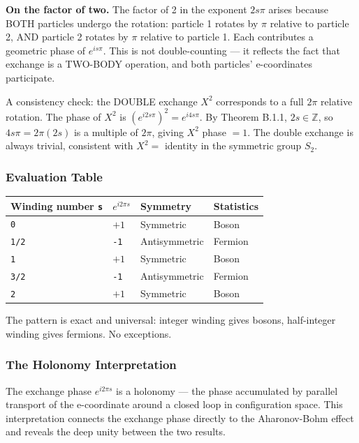 \documentclass[aps,prd,preprint,superscriptaddress,longbibliography,floatfix]{revtex4-2}
\theoremstyle{remark}
\begin{document}
\textbf{On the factor of two.} The factor of 2 in the exponent $2s\pi$ arises because BOTH particles undergo the rotation: particle 1 rotates by $\pi$ relative to particle 2, AND particle 2 rotates by $\pi$ relative to particle 1. Each contributes a geometric phase of $e^{is\pi}$. This is not double-counting --- it reflects the fact that exchange is a TWO-BODY operation, and both particles' e-coordinates participate.

A consistency check: the DOUBLE exchange $X^{2}$ corresponds to a full $2\pi$ relative rotation. The phase of $X^{2}$ is $(e^{i2s\pi})^{2} = e^{i4s\pi}$. By Theorem B.1.1, $2s \in \mathbb{Z}$, so $4s\pi = 2\pi(2s)$ is a multiple of $2\pi$, giving $X^{2}$ phase $= 1$. The double exchange is always trivial, consistent with $X^{2} =$ identity in the symmetric group $S_{2}$.


\subsubsection{Evaluation Table}


\begin{table}[H]
\begin{ruledtabular}
\begin{tabular}{p{3.8cm}p{3.8cm}p{3.8cm}p{3.8cm}}
Winding number \texttt{s} & $e^{i2\pi s}$ & Symmetry & Statistics \\
\hline
\texttt{0} & $+1$ & Symmetric & Boson \\
\texttt{1/2} & \texttt{-1} & Antisymmetric & Fermion \\
\texttt{1} & $+1$ & Symmetric & Boson \\
\texttt{3/2} & \texttt{-1} & Antisymmetric & Fermion \\
\texttt{2} & $+1$ & Symmetric & Boson \\
\end{tabular}
\end{ruledtabular}
\end{table}

The pattern is exact and universal: integer winding gives bosons, half-integer winding gives fermions. No exceptions.


\subsubsection{The Holonomy Interpretation}

The exchange phase $e^{i2\pi s}$ is a holonomy --- the phase accumulated by parallel transport of the e-coordinate around a closed loop in configuration space. This interpretation connects the exchange phase directly to the Aharonov-Bohm effect and reveals the deep unity between the two results.
\end{document}
